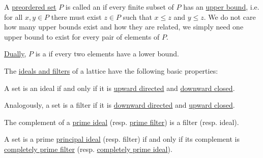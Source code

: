 \begin{definition}\label{def:directed_set}
  A \hyperref[def:preordered_set]{preordered set} \( P \) is called an  if every finite subset of \( P \) has an \hyperref[def:extremal_points/upper_and_lower_bounds]{upper bound}, i.e. for all \( x, y \in P \) there must exist \( z \in P \) such that \( x \leq z \) and \( y \leq z \). We do not care how many upper bounds exist and how they are related, we simply need one upper bound to exist for every pair of elements of \( P \).

  \hyperref[thm:preorder_duality]{Dually}, \( P \) is a  if every two elements have a lower bound.
\end{definition}

\begin{proposition}\label{thm:def:lattice_ideal}
  The \hyperref[def:lattice_ideal]{ideals and filters} of a lattice have the following basic properties:
  \begin{thmenum}
     A set is an ideal if and only if it is \hyperref[def:directed_set]{upward directed} and \hyperref[def:closed_ordered_subset]{downward closed}.

    Analogously, a set is a filter if it is \hyperref[def:directed_set]{downward directed} and \hyperref[def:closed_ordered_subset]{upward closed}.

     The complement of a \hyperref[def:lattice_ideal/prime]{prime ideal} (resp. \hyperref[def:lattice_ideal/prime]{prime filter}) is a filter (resp. ideal).

     A set is a prime \hyperref[def:lattice_ideal/principal]{principal ideal} (resp. filter) if and only if its complement is \hyperref[def:lattice_ideal/prime]{completely prime filter} (resp. \hyperref[def:lattice_ideal/prime]{completely prime ideal}).
  \end{thmenum}
\end{proposition}

